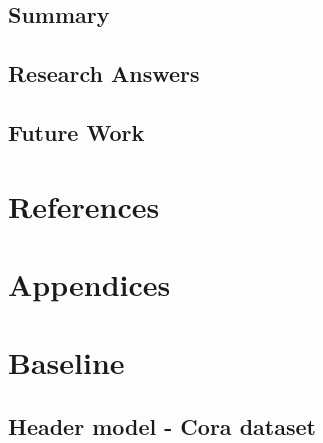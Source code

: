 \documentclass[11pt, oneside]{scrartcl}   	%
\begin{document}
\subsection{Summary}
\subsection{Research Answers}
\subsection{Future Work}

\section{References}

\section{Appendices}

\section{Baseline}
\subsection{Header model - Cora dataset}

\end{document}
